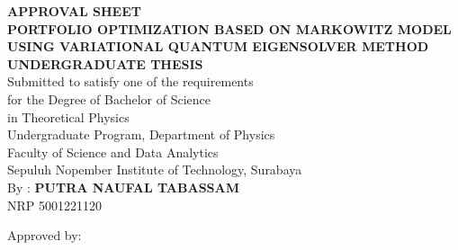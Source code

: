 \begin{center}
\large{\textbf{APPROVAL SHEET}} \\
\vspace{4mm}
\textbf{PORTFOLIO OPTIMIZATION BASED ON MARKOWITZ MODEL USING VARIATIONAL QUANTUM EIGENSOLVER METHOD} \\
\vspace{4mm}
\textbf{UNDERGRADUATE THESIS} \\
\vspace{4mm}
Submitted to satisfy one of the requirements \\
for the Degree of Bachelor of Science \\
in Theoretical Physics \\
Undergraduate Program, Department of Physics \\
Faculty of Science and Data Analytics\\
Sepuluh Nopember Institute of Technology, Surabaya \\
\vspace{4mm}
By : \textbf{PUTRA NAUFAL TABASSAM} \\
\vspace{1mm}
NRP 5001221120 \\
\vspace{4mm}
\begin{center}
	Approved by:
\end{center}

\vspace{4ex}

\begingroup
\setlength{\tabcolsep}{0pt}


\end{center}

